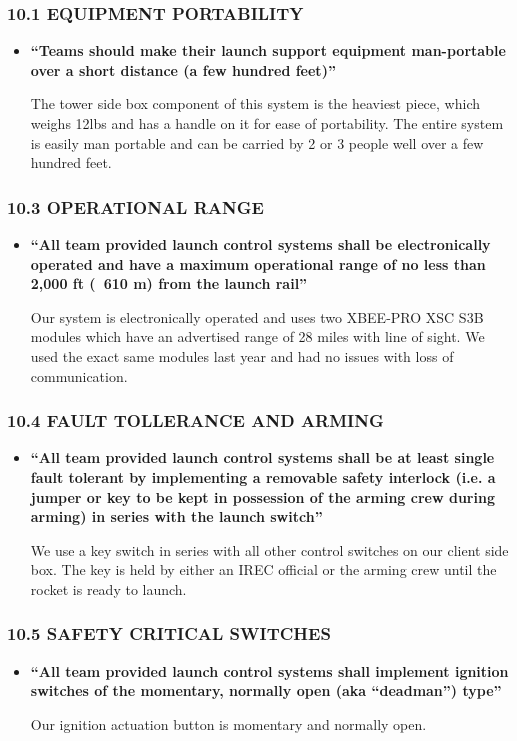 \documentclass[letter]{article}
\begin{document}
\subsubsection{10.1 EQUIPMENT PORTABILITY}
\begin{itemize}
\item {\bfseries ``Teams should make their launch support equipment man-portable over a short distance (a few
hundred feet)''}

The tower side box component of this system is the heaviest piece, which weighs
12lbs and has a handle on it for ease of portability. The entire system is
easily man portable and can be carried by 2 or 3 people well over a few hundred
feet.
\end{itemize}
\subsubsection{10.3 OPERATIONAL RANGE}
\begin{itemize}
\item {\bfseries ``All team provided launch control systems shall be electronically operated and have a maximum operational range of
no less than 2,000 ft (~610 m) from the launch rail''}

Our system is electronically operated and uses two XBEE-PRO XSC S3B modules
which have an advertised range of 28 miles with line of sight. We used the
exact same modules last year and had no issues with loss of communication.
\end{itemize}
\subsubsection{10.4 FAULT TOLLERANCE AND ARMING}
\begin{itemize}
\item {\bfseries ``All team provided launch control systems shall be at least single fault tolerant by implementing a removable safety
interlock (i.e. a jumper or key to be kept in possession of the arming crew during arming) in series with the launch
switch''}

We use a key switch in series with all other control switches on our client
side box. The key is held by either an IREC official or the arming crew until
the rocket is ready to launch.
\end{itemize}
\subsubsection{10.5 SAFETY CRITICAL SWITCHES}
\begin{itemize}
\item {\bfseries ``All team provided launch control systems shall implement ignition switches of the momentary, normally open (aka
``deadman'') type''}

Our ignition actuation button is momentary and normally open.
\end{itemize}
\end{document}
